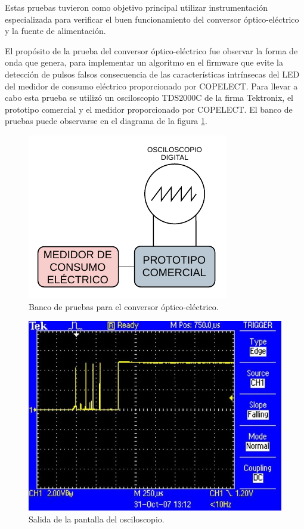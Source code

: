 Estas pruebas tuvieron como objetivo principal utilizar instrumentación especializada para verificar el buen funcionamiento del conversor óptico-eléctrico y la fuente de alimentación. 

El propósito de la prueba del conversor óptico-eléctrico fue observar la forma de onda que genera, para implementar un algoritmo en el firmware que evite la detección de pulsos falsos consecuencia de las características intrínsecas del LED del medidor de consumo eléctrico proporcionado por COPELECT. Para llevar a cabo esta prueba se utilizó un osciloscopio TDS2000C de la firma Tektronix, el prototipo comercial y el medidor proporcionado por COPELECT. El banco de pruebas puede observarse en el diagrama de la figura \ref{fig:testHWBankCOE}.

\begin{figure}[ht]
	\centering
	\includegraphics[scale=1.2]{./Figures/test_pulses_bank.pdf}
	\caption{Banco de pruebas para el conversor óptico-eléctrico.}
	\label{fig:testHWBankCOE}
\end{figure}

\begin{figure}[ht]
	\centering
	\includegraphics[scale=0.5]{./Figures/pulses_debounce.jpg}
	\caption{Salida de la pantalla del osciloscopio.}
	\label{fig:testHWPhoto}
\end{figure}

